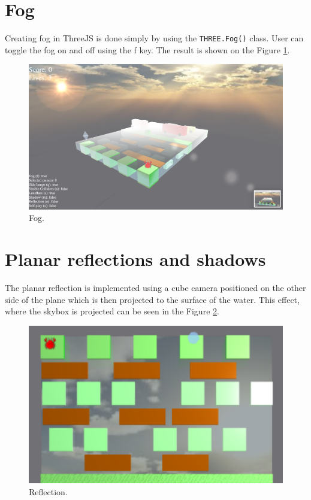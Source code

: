 \documentclass[a4paper,10pt, twocolumn]{article}
\begin{document}
\section{Fog}
Creating fog in ThreeJS is done simply by using the \lstinline{THREE.Fog()} class. User can toggle the fog on and off using the f key. The result is shown on the Figure \ref{fog}.

\begin{figure}[!htb]
	\centering
	\includegraphics[width=\linewidth]{images/fog.png}
  	\caption{Fog.}
	\label{fog}
\end{figure}

\section{Planar reflections and shadows}
The planar reflection is implemented using a cube camera positioned on the other side of the plane which is then projected to the surface of the water. This effect, where the skybox is projected can be seen in the Figure \ref{reflection}.

\begin{figure}[!htb]
	\centering
 	\includegraphics[width=\linewidth]{images/reflection.png}
  	\caption{Reflection.}
	\label{reflection}
\end{figure}
\end{document}
